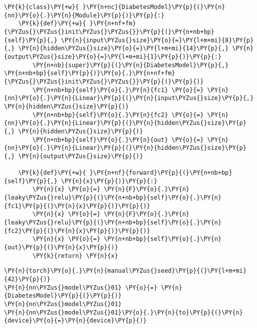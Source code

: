     \begin{tcolorbox}[breakable, size=fbox, boxrule=1pt, pad at break*=1mm,colback=cellbackground, colframe=cellborder]
\begin{Verbatim}[commandchars=\\\{\}]
\PY{k}{class}\PY{+w}{ }\PY{n+nc}{DiabetesModel}\PY{p}{(}\PY{n}{nn}\PY{o}{.}\PY{n}{Module}\PY{p}{)}\PY{p}{:}
    \PY{k}{def}\PY{+w}{ }\PY{n+nf+fm}{\PYZus{}\PYZus{}init\PYZus{}\PYZus{}}\PY{p}{(}\PY{n+nb+bp}{self}\PY{p}{,} \PY{n}{input\PYZus{}size}\PY{o}{=}\PY{l+m+mi}{8}\PY{p}{,} \PY{n}{hidden\PYZus{}size}\PY{o}{=}\PY{l+m+mi}{14}\PY{p}{,} \PY{n}{output\PYZus{}size}\PY{o}{=}\PY{l+m+mi}{1}\PY{p}{)}\PY{p}{:}
        \PY{n+nb}{super}\PY{p}{(}\PY{n}{DiabetesModel}\PY{p}{,} \PY{n+nb+bp}{self}\PY{p}{)}\PY{o}{.}\PY{n+nf+fm}{\PYZus{}\PYZus{}init\PYZus{}\PYZus{}}\PY{p}{(}\PY{p}{)}
        \PY{n+nb+bp}{self}\PY{o}{.}\PY{n}{fc1} \PY{o}{=} \PY{n}{nn}\PY{o}{.}\PY{n}{Linear}\PY{p}{(}\PY{n}{input\PYZus{}size}\PY{p}{,} \PY{n}{hidden\PYZus{}size}\PY{p}{)}
        \PY{n+nb+bp}{self}\PY{o}{.}\PY{n}{fc2} \PY{o}{=} \PY{n}{nn}\PY{o}{.}\PY{n}{Linear}\PY{p}{(}\PY{n}{hidden\PYZus{}size}\PY{p}{,} \PY{n}{hidden\PYZus{}size}\PY{p}{)}
        \PY{n+nb+bp}{self}\PY{o}{.}\PY{n}{out} \PY{o}{=} \PY{n}{nn}\PY{o}{.}\PY{n}{Linear}\PY{p}{(}\PY{n}{hidden\PYZus{}size}\PY{p}{,} \PY{n}{output\PYZus{}size}\PY{p}{)}

    \PY{k}{def}\PY{+w}{ }\PY{n+nf}{forward}\PY{p}{(}\PY{n+nb+bp}{self}\PY{p}{,} \PY{n}{x}\PY{p}{)}\PY{p}{:}
        \PY{n}{x} \PY{o}{=} \PY{n}{F}\PY{o}{.}\PY{n}{leaky\PYZus{}relu}\PY{p}{(}\PY{n+nb+bp}{self}\PY{o}{.}\PY{n}{fc1}\PY{p}{(}\PY{n}{x}\PY{p}{)}\PY{p}{)}
        \PY{n}{x} \PY{o}{=} \PY{n}{F}\PY{o}{.}\PY{n}{leaky\PYZus{}relu}\PY{p}{(}\PY{n+nb+bp}{self}\PY{o}{.}\PY{n}{fc2}\PY{p}{(}\PY{n}{x}\PY{p}{)}\PY{p}{)}
        \PY{n}{x} \PY{o}{=} \PY{n+nb+bp}{self}\PY{o}{.}\PY{n}{out}\PY{p}{(}\PY{n}{x}\PY{p}{)}
        \PY{k}{return} \PY{n}{x}
\end{Verbatim}
\end{tcolorbox}

    \begin{tcolorbox}[breakable, size=fbox, boxrule=1pt, pad at break*=1mm,colback=cellbackground, colframe=cellborder]
\begin{Verbatim}[commandchars=\\\{\}]
\PY{n}{torch}\PY{o}{.}\PY{n}{manual\PYZus{}seed}\PY{p}{(}\PY{l+m+mi}{42}\PY{p}{)}
\PY{n}{nn\PYZus{}model\PYZus{}01} \PY{o}{=} \PY{n}{DiabetesModel}\PY{p}{(}\PY{p}{)}
\PY{n}{nn\PYZus{}model\PYZus{}01}
\PY{n}{nn\PYZus{}model\PYZus{}01}\PY{o}{.}\PY{n}{to}\PY{p}{(}\PY{n}{device}\PY{o}{=}\PY{n}{device}\PY{p}{)}
\end{Verbatim}
\end{tcolorbox}

